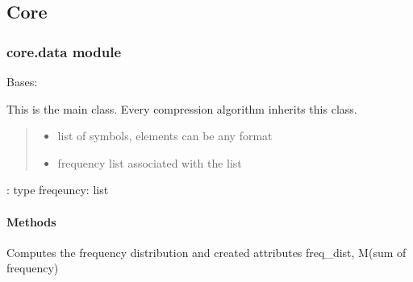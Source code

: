 \documentclass[letterpaper,10pt,english]{sphinxmanual}
\begin{document}
\subsection{Core}
\label{\detokenize{core:core}}\label{\detokenize{core::doc}}

\subsubsection{core.data module}
\label{\detokenize{core:module-core.data}}\label{\detokenize{core:core-data-module}}

\begin{fulllineitems}
\label{\detokenize{core:core.data.Data}}
\pysigstartsignatures
{}
\pysigstopsignatures
\sphinxAtStartPar
Bases: 

\sphinxAtStartPar
This is the main class. Every compression algorithm inherits this class.
\begin{quote}\begin{description}
\begin{itemize}
\item {} 
\sphinxAtStartPar
{} \textendash{} list of symbols, elements can be any format

\item {} 
\sphinxAtStartPar
{} \textendash{} frequency list associated with the list

\end{itemize}

\end{description}\end{quote}

\sphinxAtStartPar
: type freqeuncy: list


\paragraph{Methods}
\label{\detokenize{core:methods}}\begin{description}
\sphinxAtStartPar
Computes the frequency distribution and created attributes freq\_dist, M(sum of frequency)


\end{description}
\end{fulllineitems}
\end{document}
